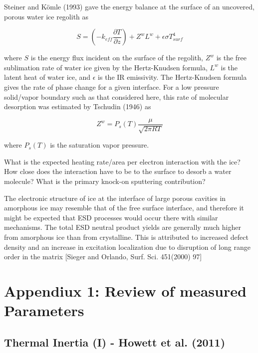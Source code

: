 \documentclass[11pt]{article} %
\begin{document}
\begin{itemize}
	Steiner and K\"{o}mle (1993) gave the energy balance at the surface of an uncovered, porous water ice regolith as
	
	\begin{equation}
	S = \left( - k_{eff} \frac{\partial T}{\partial z} \right) + Z^{w}L^{w} +\epsilon \sigma T_{surf}^{4}
	\end{equation}
	
	where $S$ is the energy flux incident on the surface of the regolith, $Z^{w}$ is the free sublimation rate of water ice given by the Hertz-Knudsen formula, $L^{w}$ is the latent heat of water ice, and $\epsilon$ is the IR emissivity. The Hertz-Knudsen formula gives the rate of phase change for a given interface. For a low pressure solid/vapor boundary such as that considered here, this rate of molecular desorption was estimated by Tschudin (1946) as
	
	\begin{equation}
	Z^{w} = P_{s}(T)\frac{\mu}{\sqrt{2\pi R T}}
	\end{equation}
	
	where $P_{s}(T)$ is the saturation vapor pressure.
	
	What is the expected heating rate/area per electron interaction with the ice? How close does the interaction have to be to the surface to desorb a water molecule? What is the primary knock-on sputtering contribution?
	
The electronic structure of ice at the interface of large porous cavities in amorphous ice may resemble that of the free surface interface, and therefore it might be expected that ESD processes would occur there with similar mechanisms. The total ESD neutral product yields are generally much higher from amorphous ice than from crystalline. This is attributed to increased
defect density and an increase in excitation localization due to disruption of long range order in the matrix [Sieger and Orlando, Surf. Sci. 451(2000) 97]

\newpage

\section{Appendiux 1: Review of measured Parameters}
\label{sec:measured}

\subsection{Thermal Inertia (I) - Howett et al. (2011)}
\label{sec:inertia}


\end{itemize}
\end{document}
